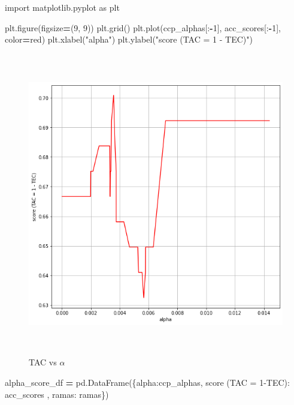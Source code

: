 \documentclass[
  11pt,
  a4paper,
]{article}
\newenvironment{Shaded}{\begin{snugshade}}{\end{snugshade}}
\newcommand{\DecValTok}[1]{\textcolor[rgb]{0.00,0.00,0.81}{#1}}
\newcommand{\ImportTok}[1]{#1}
\newcommand{\NormalTok}[1]{#1}
\newcommand{\OperatorTok}[1]{\textcolor[rgb]{0.81,0.36,0.00}{\textbf{#1}}}
\newcommand{\StringTok}[1]{\textcolor[rgb]{0.31,0.60,0.02}{#1}}
\begin{document}
\begin{Shaded}
\begin{Highlighting}[]
\ImportTok{import}\NormalTok{ matplotlib.pyplot }\ImportTok{as}\NormalTok{ plt}

\NormalTok{plt.figure(figsize}\OperatorTok{=}\NormalTok{(}\DecValTok{9}\NormalTok{,  }\DecValTok{9}\NormalTok{))}
\NormalTok{plt.grid()}
\NormalTok{plt.plot(ccp\_alphas[:}\OperatorTok{{-}}\DecValTok{1}\NormalTok{], acc\_scores[:}\OperatorTok{{-}}\DecValTok{1}\NormalTok{], color}\OperatorTok{=}\StringTok{\textquotesingle{}red\textquotesingle{}}\NormalTok{)}
\NormalTok{plt.xlabel(}\StringTok{"alpha"}\NormalTok{)}
\NormalTok{plt.ylabel(}\StringTok{"score (TAC = 1 {-} TEC)"}\NormalTok{)}
\end{Highlighting}
\end{Shaded}

\begin{figure}
\centering
\includegraphics[width=6.25in,height=5.20833in]{output_695_1.png}
\caption{TAC vs \(\alpha\)}
\end{figure}

\newpage

\begin{Shaded}
\begin{Highlighting}[]
\NormalTok{alpha\_score\_df }\OperatorTok{=}\NormalTok{ pd.DataFrame(\{}\StringTok{\textquotesingle{}alpha\textquotesingle{}}\NormalTok{:ccp\_alphas, }\StringTok{\textquotesingle{}score (TAC = 1{-}TEC)\textquotesingle{}}\NormalTok{: acc\_scores , }\StringTok{\textquotesingle{}ramas\textquotesingle{}}\NormalTok{: ramas\})}
\end{Highlighting}
\end{Shaded}
\end{document}
